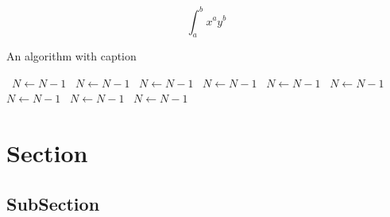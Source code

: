 \documentclass[a4paper]{article}
\begin{document}
\[ \int_{a}^{b}{x^{a}y^{b}} \]

\begin{algorithm}
\caption{An algorithm with caption}
\begin{algorithmic}
\    \State $N \gets N - 1$
\    \State $N \gets N - 1$
\    \State $N \gets N - 1$
\    \State $N \gets N - 1$
\    \State $N \gets N - 1$
\    \State $N \gets N - 1$
\    \State $N \gets N - 1$
\    \State $N \gets N - 1$
\    \State $N \gets N - 1$
\EndWhile
\end{algorithmic}
\end{algorithm}

\section{Section}

\subsection{SubSection}
\end{document}
